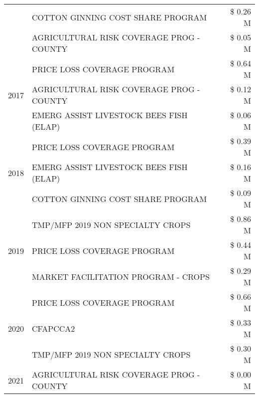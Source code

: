 \begin{tabular}{llr}
 & COTTON GINNING COST SHARE PROGRAM             & \$ 0.26 M \\
 & AGRICULTURAL RISK COVERAGE PROG - COUNTY      & \$ 0.05 M \\
\cline{1-3}
\multirow[t]{3}{*}{2017} & PRICE LOSS COVERAGE PROGRAM & \$ 0.64 M \\
 & AGRICULTURAL RISK COVERAGE PROG - COUNTY & \$ 0.12 M \\
 & EMERG ASSIST LIVESTOCK BEES FISH (ELAP) & \$ 0.06 M \\
\cline{1-3}
\multirow[t]{3}{*}{2018} & PRICE LOSS COVERAGE PROGRAM & \$ 0.39 M \\
 & EMERG ASSIST LIVESTOCK BEES FISH (ELAP) & \$ 0.16 M \\
 & COTTON GINNING COST SHARE PROGRAM & \$ 0.09 M \\
\cline{1-3}
\multirow[t]{3}{*}{2019} & TMP/MFP 2019 NON SPECIALTY CROPS & \$ 0.86 M \\
 & PRICE LOSS COVERAGE PROGRAM & \$ 0.44 M \\
 & MARKET FACILITATION PROGRAM - CROPS & \$ 0.29 M \\
\cline{1-3}
\multirow[t]{3}{*}{2020} & PRICE LOSS COVERAGE PROGRAM & \$ 0.66 M \\
 & CFAPCCA2 & \$ 0.33 M \\
 & TMP/MFP 2019 NON SPECIALTY CROPS & \$ 0.30 M \\
\cline{1-3}
2021 & AGRICULTURAL RISK COVERAGE PROG - COUNTY & \$ 0.00 M \\
\cline{1-3}
\bottomrule
\end{tabular}
